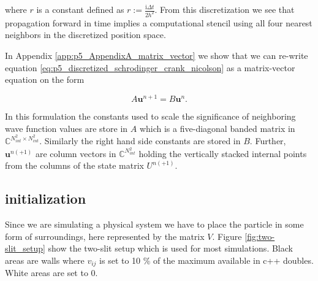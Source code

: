 \documentclass[../main_proj5.tex]{subfiles}
\begin{document}
\noindent where $r$ is a constant defined as $r := \frac{\text{i} \Delta t}{2 h^{2}}$. From this discretization we see that propagation forward in time implies a computational stencil using all four nearest neighbors in the discretized position space. 
 
In Appendix \ref{app:p5_AppendixA_matrix_vector} we show that we can re-write equation \eqref{eq:p5_discretized_schrodinger_crank_nicolson} as a matrix-vector equation on the form 

\begin{equation}
\label{eq:p5_general_matrix-vector-equation}    
    A \mathbf{u}^{n+1} = B \mathbf{u}^{n}.
\end{equation}

\noindent In this formulation the constants used to scale the significance of neighboring wave function values are store in $A$ which is a five-diagonal banded matrix in $\mathbb{C}^{N_{int}^{2}\times N_{int}^{2}}$. Similarly the right hand side constants are stored in $B$. Further, $\mathbf{u}^{n(+1)}$ are column vectors in $\mathbb{C}^{N_{int}^{2}}$ holding the vertically stacked internal points from the columns of the state matrix $U^{n(+1)}$. 


\subsection{initialization}

Since we are simulating a physical system we have to place the particle in some form of surroundings, here represented by the matrix $V$. Figure \ref{fig:two-slit_setup} show the two-slit setup which is used for most simulations. Black areas are walls where $v_{ij}$ is set to 10 \% of the maximum available in c++ doubles. White areas are set to 0.
\end{document}
